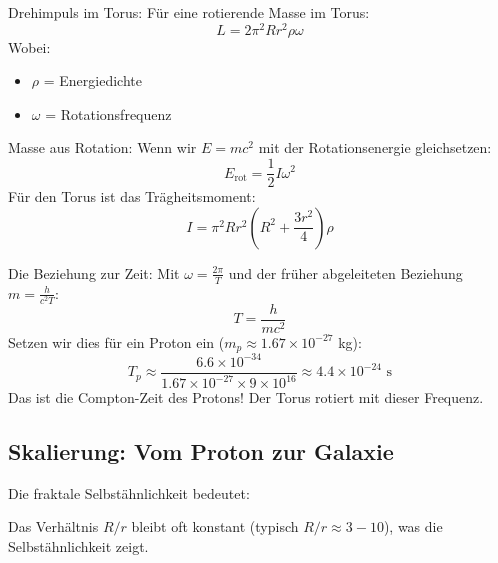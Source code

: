 	Drehimpuls im Torus:
	Für eine rotierende Masse im Torus:
	\[
	L = 2\pi^2 R r^2 \rho \omega
	\]
	Wobei:
	\begin{itemize}
		\item \( \rho \) = Energiedichte
		\item \( \omega \) = Rotationsfrequenz
	\end{itemize}
	
	Masse aus Rotation:
	Wenn wir \( E = mc^2 \) mit der Rotationsenergie gleichsetzen:
	\[
	E_{\text{rot}} = \frac{1}{2} I \omega^2
	\]
	Für den Torus ist das Trägheitsmoment:
	\[
	I = \pi^2 R r^2 \left(R^2 + \frac{3r^2}{4}\right) \rho
	\]
	
	Die Beziehung zur Zeit:
	Mit \( \omega = \frac{2\pi}{T} \) und der früher abgeleiteten Beziehung \( m = \frac{h}{c^2 T} \):
	\[
	T = \frac{h}{mc^2}
	\]
	Setzen wir dies für ein Proton ein (\( m_p \approx 1.67 \times 10^{-27} \) kg):
	\[
	T_p \approx \frac{6.6 \times 10^{-34}}{1.67 \times 10^{-27} \times 9 \times 10^{16}} \approx 4.4 \times 10^{-24} \text{ s}
	\]
	Das ist die Compton-Zeit des Protons! Der Torus rotiert mit dieser Frequenz.
	
	\subsection{Skalierung: Vom Proton zur Galaxie}
	Die fraktale Selbstähnlichkeit bedeutet:
	\begin{table}[H]
		\centering
	\end{table}
	Das Verhältnis \( R/r \) bleibt oft konstant (typisch \( R/r \approx 3-10 \)), was die Selbstähnlichkeit zeigt.
	
